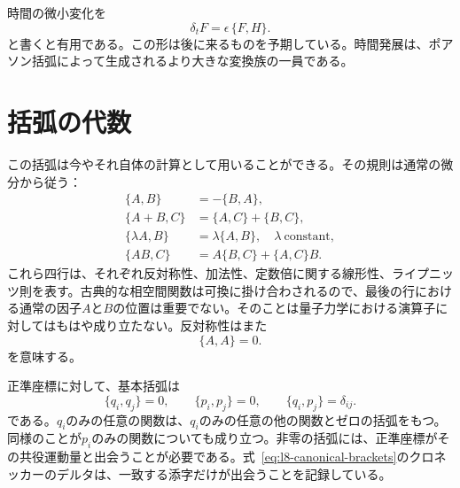 \begin{classroomqa}
\end{classroomqa}

時間の微小変化を\begin{equation}
  \delta_t F=\epsilon\,\{F,H\}.
  \label{eq:l8-small-time-step}
\end{equation}と書くと有用である。この形は後に来るものを予期している。時間発展は、ポアソン括弧によって生成されるより大きな変換族の一員である。

\section{括弧の代数}

この括弧は今やそれ自体の計算として用いることができる。その規則は通常の微分から従う：\begin{align}
  \{A,B\}&=-\{B,A\}, \label{eq:l8-antisymmetry}\\
  \{A+B,C\}&=\{A,C\}+\{B,C\}, \label{eq:l8-additivity}\\
  \{\lambda A,B\}&=\lambda\{A,B\},
    \quad \lambda\ \text{constant}, \label{eq:l8-scalar-rule}\\
  \{AB,C\}&=A\{B,C\}+\{A,C\}B. \label{eq:l8-leibniz}
\end{align}これら四行は、それぞれ反対称性、加法性、定数倍に関する線形性、ライプニッツ則を表す。古典的な相空間関数は可換に掛け合わされるので、最後の行における通常の因子\(A\)と\(B\)の位置は重要でない。そのことは量子力学における演算子に対してはもはや成り立たない。反対称性はまた\begin{equation}
  \{A,A\}=0.
  \label{eq:l8-self-bracket}
\end{equation}を意味する。

正準座標に対して、基本括弧は\begin{equation}
  \boxed{
  \{q_i,q_j\}=0,\qquad
  \{p_i,p_j\}=0,\qquad
  \{q_i,p_j\}=\delta_{ij}.}
  \label{eq:l8-canonical-brackets}
\end{equation}である。\(q_i\)のみの任意の関数は、\(q_i\)のみの任意の他の関数とゼロの括弧をもつ。同様のことが\(p_i\)のみの関数についても成り立つ。非零の括弧には、正準座標がその共役運動量と出会うことが必要である。式~\eqref{eq:l8-canonical-brackets}のクロネッカーのデルタは、一致する添字だけが出会うことを記録している。

